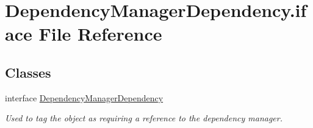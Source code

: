 \hypertarget{DependencyManagerDependency_8iface}{\section{Dependency\-Manager\-Dependency.\-iface File Reference}
\label{DependencyManagerDependency_8iface}
}
\subsection*{Classes}
\begin{DoxyCompactItemize}
\item 
interface \hyperlink{interfaceDependencyManagerDependency}{Dependency\-Manager\-Dependency}
\begin{DoxyCompactList}\small\item\em Used to tag the object as requiring a reference to the dependency manager. \end{DoxyCompactList}\end{DoxyCompactItemize}
